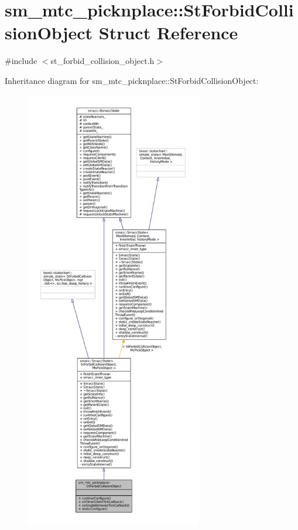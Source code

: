 \hypertarget{structsm__mtc__picknplace_1_1StForbidCollisionObject}{}\section{sm\+\_\+mtc\+\_\+picknplace\+:\+:St\+Forbid\+Collision\+Object Struct Reference}
\label{structsm__mtc__picknplace_1_1StForbidCollisionObject}


{\ttfamily \#include $<$st\+\_\+forbid\+\_\+collision\+\_\+object.\+h$>$}



Inheritance diagram for sm\+\_\+mtc\+\_\+picknplace\+:\+:St\+Forbid\+Collision\+Object\+:
\nopagebreak
\begin{figure}[H]
\begin{center}
\leavevmode
\includegraphics[height=550pt]{structsm__mtc__picknplace_1_1StForbidCollisionObject__inherit__graph}
\end{center}
\end{figure}


